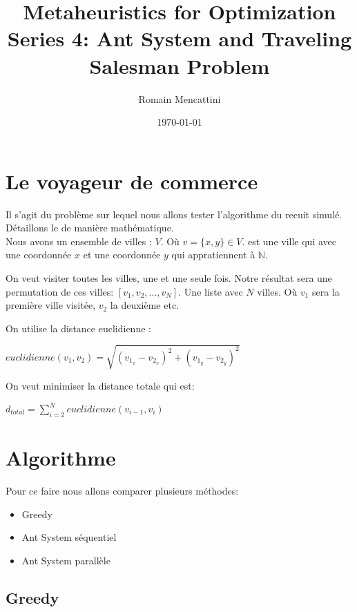 \documentclass[a4paper, 11pt]{article}
\title{Metaheuristics for Optimization\\Series 4: Ant System and Traveling Salesman Problem}
\author{Romain Mencattini}
\date{\today}
\begin{document}
\maketitle
\newpage
\tableofcontents
\newpage

\section{Le voyageur de commerce}
Il s'agit du problème sur lequel nous allons tester l'algorithme du recuit simulé.\\
Détaillons le de manière mathématique.\\
Nous avons un ensemble de villes : $V$. Où $v = \{x,y\} \in V$. est une ville qui avec une coordonnée $x$ et une coordonnée $y$ qui appratiennent 
à $\mathbb{N}$.

On veut visiter toutes les villes, une et une seule fois. Notre résultat sera une permutation de ces villes: $[v_1,v_2,...,v_N]$.
Une liste avec $N$ villes. Où $v_1$ 
sera la première ville visitée, $v_2$ la deuxième etc.

On utilise la distance euclidienne :
\begin{center}
\begin{math}
 euclidienne(v_1,v_2) = \sqrt{(v_{1_x} - v_{2_x})^2 + (v_{1_y} - v_{2_y})^2}
\end{math} 
\end{center}

On veut minimiser la distance totale qui est:
\begin{center}
 \begin{math}
  d_{total} = \sum\limits_{i=2}^{N} euclidienne(v_{i-1},v_i)
 \end{math}
\end{center}

\section{Algorithme}

Pour ce faire nous allons comparer plusieurs méthodes:
\begin{itemize}
 \item Greedy
 \item Ant System séquentiel
 \item Ant System parallèle
\end{itemize}

\subsection{Greedy}
\end{document}
